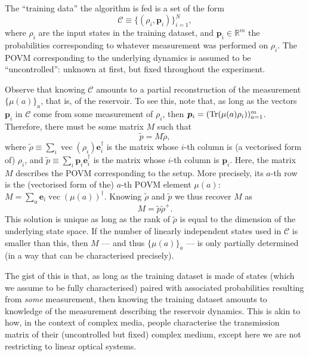 \documentclass[12pt]{report}
\newcommand{\RR}{\mathbb{R}}
\newcommand{\on}[1]{\operatorname{#1}}
\newcommand{\bs}[1]{\boldsymbol{#1}}
\newcommand{\calC}{{\mathcal{C}}}
\begin{document}
The ``training data'' the algorithm is fed is a set of the form
\begin{equation}
	\calC \equiv \{ (\rho_i, \bs p_i) \}_{i=1}^N,
\end{equation}
where $\rho_i$ are the input states in the training dataset, and $\bs p_i\in\RR^m$ the probabilities corresponding to whatever measurement was performed on $\rho_i$.
The POVM corresponding to the underlying dynamics is assumed to be ``uncontrolled'': unknown at first, but fixed throughout the experiment.

Observe that knowing $\calC$ amounts to a partial reconstruction of the measurement $\{\mu(a)\}_a$, that is, of the reservoir. To see this, note that, as long as the vectors $\bs p_i$ in $\calC$ come from some measurement of $\rho_i$, then $\bs p_i= (\Tr(\mu(a)\rho_i))_{a=1}^m$.
Therefore, there must be some matrix $M$ such that
\begin{equation}
	\tilde p = M \tilde \rho,
\end{equation}
where $\tilde\rho\equiv \sum_i \on{vec}(\rho_i)\bs e_i^\dagger$ is the matrix whose $i$-th column is (a vectorised form of) $\rho_i$, and $\tilde p\equiv \sum_i \bs p_i \bs e_i^\dagger$ is the matrix whose $i$-th column is $\bs p_i$.
Here, the matrix $M$ describes the POVM corresponding to the setup.
More precisely, its $a$-th row is the (vectorised form of the) $a$-th POVM element $\mu(a)$:
$M= \sum_a \bs e_i \on{vec}(\mu(a))^\dagger$.
Knowing $\tilde\rho$ and $\tilde p$ we thus recover $M$ as
\begin{equation}\label{eq:QRC_POVM_from_trainingdataset}
	M = \tilde p \tilde\rho^+.
\end{equation}
This solution is unique as long as the rank of $\tilde\rho$ is equal to the dimension of the underlying state space. If the number of linearly independent states used in $\calC$ is smaller than this, then $M$ --- and thus $\{\mu(a)\}_a$ --- is only partially determined (in a way that can be characterised precisely).

The gist of this is that, as long as the training dataset is made of states (which we assume to be fully characterised) paired with associated probabilities resulting from \emph{some} measurement, then knowing the training dataset amounts to knowledge of the measurement describing the reservoir dynamics.
This is akin to how, in the context of complex media, people characterise the transmission matrix of their (uncontrolled but fixed) complex medium, except here we are not restricting to linear optical systems.
\end{document}

